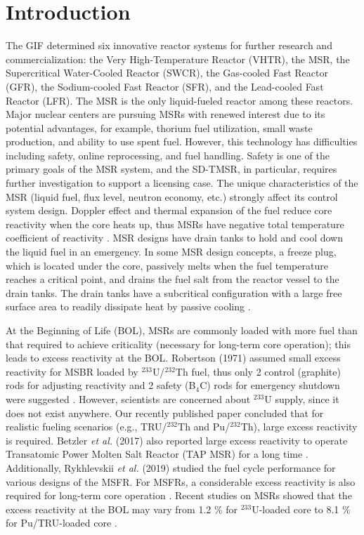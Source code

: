 \section{Introduction} \label{Introduction}

The \gls{GIF} \cite{doe2002technology} determined six innovative reactor 
systems for further research and commercialization: the Very High-Temperature Reactor (VHTR), the \gls{MSR}, the 
Supercritical Water-Cooled Reactor (SWCR), the Gas-cooled Fast Reactor (GFR), 
the Sodium-cooled Fast Reactor (SFR), and the Lead-cooled Fast Reactor (LFR). 
The MSR is the only liquid-fueled reactor among these reactors. Major nuclear 
centers are pursuing MSRs with renewed interest \cite{betzler_impacts_2019, 
ashraf2020whole}
due to its potential advantages, for example, thorium fuel utilization, small waste production, and ability to use spent fuel.
However, this technology has difficulties including safety, 
online reprocessing, and fuel handling. Safety is one of the primary goals of
the MSR system, and the SD-TMSR, in particular, requires further investigation to support a licensing case.
The unique characteristics of the MSR (liquid fuel, flux level, neutron economy, 
etc.) strongly affect its control system design. Doppler effect and thermal expansion of the fuel reduce
core reactivity when the core heats up, thus MSRs have negative total temperature coefficient of reactivity 
\cite{nuttin2005potential}.
MSR designs have drain tanks to 
hold and cool down the liquid fuel in an emergency. In some MSR design concepts, a freeze plug, which 
is located under the core, passively melts when the fuel temperature reaches a 
critical point, and drains the fuel salt from the reactor vessel to the drain 
tanks. The drain tanks have a subcritical
configuration with a large free 
surface area to readily dissipate heat by passive cooling 
\cite{elsheikh2013safety}.

At the Beginning of Life (BOL), MSRs are commonly loaded with more
fuel than that required to achieve criticality (necessary for long-term core 
operation); this leads to excess reactivity at the BOL. Robertson (1971) assumed small excess reactivity for \gls{MSBR} loaded by $^{233}$U/$^{232}$Th fuel, thus only 2 control (graphite) rods for adjusting reactivity and 2 safety (B$_4$C) rods for emergency shutdown were suggested \cite{robertson_conceptual_1971}. However, scientists are concerned about $^{233}$U supply, since it does not exist anywhere. Our recently published paper \cite{ashraf2020Strategies} concluded that for realistic fueling scenarios (e.g., TRU/$^{232}$Th and Pu/$^{232}$Th), large excess reactivity is required. Betzler \emph{et al.} (2017) also reported large excess reactivity to operate Transatomic Power Molten Salt Reactor (TAP MSR) for a long time \cite{betzler2017assessment}. Additionally, Rykhlevskii \emph{et al.} (2019) studied the fuel cycle performance for various designs of the \gls{MSFR}. For MSFRs, a considerable excess reactivity is also required for long-term core operation \cite{rykhlevskii_fuel_2019}. Recent studies on MSRs showed that the excess reactivity 
at the BOL may vary from 1.2 \% for $^{233}$U-loaded core \cite{rykhlevskii2019modeling,betzler2016modeling} to 8.1 \% for Pu/TRU-loaded core \cite{ashraf2020Strategies}.

